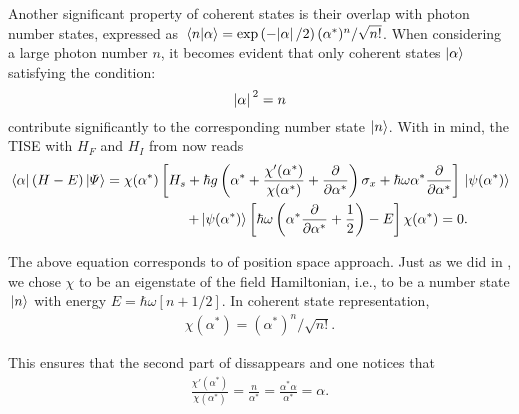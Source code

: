 Another significant property of coherent states is their overlap with photon number states, expressed as 
\( \braket*{n}{\alpha} = \exp\left(-\abs*{\alpha}/2\right) (\alpha^*)^n/\sqrt{n!} \). 
When considering a large photon number $n$, it becomes evident that only coherent states 
$\ket{\alpha}$ satisfying the condition:
\begin{equation}
\label{eq:class_jcm_eq22}
\abs*{\alpha}^2 = n
\end{equation}
contribute significantly to the corresponding number state \(\ket{n}\). 
With  in mind, the TISE with $H_F$ and $H_I$ from 
 now reads
\begin{eqnarray}
    \label{eq:class_jcm_eq23}
    \bra*{\alpha}(H - E)\ket*{\Psi} = \chi(\alpha^*)
    \left[H_s + \hbar g \left(\alpha ^* + 
    \frac{\chi'(\alpha^*)}{\chi(\alpha^*)} + \dfrac{\partial}{\partial \alpha^*}
    \right)\sigma_x + \hbar \omega \alpha^* \dfrac{\partial}{\partial \alpha^*}\right] 
    \ket*{\psi(\alpha^*)} \nonumber \\
    + \ket*{\psi(\alpha^*)}
    \left[\hbar \omega \left(
        \alpha^* \dfrac{\partial}{\partial \alpha^*} + \frac{1}{2}\right) - E\right]\chi(\alpha^*) = 0. \quad \qquad
\end{eqnarray}

The above equation corresponds to  of position space approach. 
Just as we did in , we chose \(\chi\) to be an eigenstate of the field 
Hamiltonian, i.e., to be a number state \(\ket*{n}\) with energy \(E = \hbar \omega \left[n + 1/2\right]\).
In coherent state representation, 
\begin{eqnarray}
    \label{eq:class_jcm_eq24}
    \chi(\alpha^*) =  (\alpha^*)^n/\sqrt{n!}. 
\end{eqnarray}

This ensures that the second part of  dissappears and one notices that
\begin{eqnarray}
    \label{eq:class_jcm_eq25}   
    \frac{\chi'(\alpha^*)}{\chi(\alpha^*)} = \frac{n}{\alpha^*} = \frac{\alpha^*\alpha}{\alpha^*} = \alpha.
\end{eqnarray}


